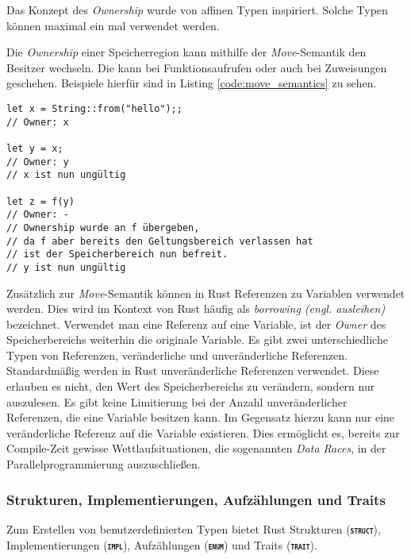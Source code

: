 Das Konzept des \textit{Ownership} wurde von affinen Typen inspiriert.\cite{embeddedRustOS}
Solche Typen können maximal ein mal verwendet werden.\cite{affineTypes}

Die \textit{Ownership} einer Speicherregion kann mithilfe der \textit{Move}-Semantik den Besitzer wechseln.
Die kann bei Funktionsaufrufen oder auch bei Zuweisungen geschehen. Beispiele hierfür sind in Listing
\ref{code:move_semantics} zu sehen.\cite{rustBook}

\begin{lstlisting}[float,caption={Beispieldarstellung der \textit{Move}-Semantik},label=code:move_semantics]
let x = String::from("hello");;
// Owner: x

let y = x;
// Owner: y
// x ist nun ungültig

let z = f(y) 
// Owner: -
// Ownership wurde an f übergeben,
// da f aber bereits den Geltungsbereich verlassen hat
// ist der Speicherbereich nun befreit.
// y ist nun ungültig
\end{lstlisting}

Zusätzlich zur \textit{Move}-Semantik können in Rust Referenzen zu Variablen verwendet werden. Dies wird im Kontext
von Rust häufig als \textit{borrowing (engl. ausleihen)} bezeichnet. Verwendet man eine Referenz auf eine Variable,
ist der \textit{Owner} des Speicherbereichs weiterhin die originale Variable. Es gibt zwei unterschiedliche
Typen von Referenzen, veränderliche und unveränderliche Referenzen. Standardmäßig werden in Rust unveränderliche
Referenzen verwendet. Diese erlauben es nicht, den Wert des Speicherbereichs zu verändern, sondern nur auszulesen.
Es gibt keine Limitierung bei der Anzahl unveränderlicher Referenzen, die eine Variable besitzen kann. Im Gegensatz
hierzu kann nur eine veränderliche Referenz auf die Variable existieren. Dies ermöglicht es, bereits zur
Compile-Zeit gewisse Wettlaufsituationen, die sogenannten \textit{Data Races},
in der Parallelprogrammierung auszuschließen.\cite{rustBook}

\subsubsection{Strukturen, Implementierungen, Aufzählungen und Traits}

Zum Erstellen von benutzerdefinierten Typen bietet Rust Strukturen (\texttt{\textsc{\textbf{struct}}}),
Implementierungen (\texttt{\textsc{\textbf{impl}}}), Aufzählungen (\texttt{\textsc{\textbf{enum}}}) und
Traits (\texttt{\textsc{\textbf{trait}}}).


